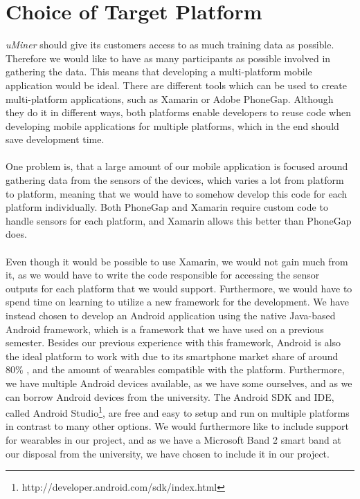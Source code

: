 
\section{Choice of Target Platform}
\label{sec:choice_of_platform}

\emph{uMiner} should give its customers access to as much training data as possible. Therefore we would like to have as many participants as possible involved in gathering the data. This means that developing a multi-platform mobile application would be ideal. There are different tools which can be used to create multi-platform applications, such as Xamarin or Adobe PhoneGap. Although they do it in different ways, both platforms enable developers to reuse code when developing mobile applications for multiple platforms, which in the end should save development time. 
\\\\
One problem is, that a large amount of our mobile application is focused around gathering data from the sensors of the devices, which varies a lot from platform to platform, meaning that we would have to somehow develop this code for each platform individually. Both PhoneGap and Xamarin require custom code to handle sensors for each platform, and Xamarin allows this better than PhoneGap does. 
\\\\
Even though it would be possible to use Xamarin, we would not gain much from it, as we would have to write the code responsible for accessing the sensor outputs for each platform that we would support. Furthermore, we would have to spend time on learning to utilize a new framework for the development. We have instead chosen to develop an Android application using the native Java-based Android framework, which is a framework that we have used on a previous semester. Besides our previous experience with this framework, Android is also the ideal platform to work with due to its smartphone market share of around 80\% \parencite{android_os_market_share}, and the amount of wearables compatible with the platform. Furthermore, we have multiple Android devices available, as we have some ourselves, and as we can borrow Android devices from the university. The Android SDK and IDE, called Android Studio\footnote{http://developer.android.com/sdk/index.html}, are free and easy to setup and run on multiple platforms in contrast to many other options. We would furthermore like to include support for wearables in our project, and as we have a Microsoft Band 2 smart band at our disposal from the university, we have chosen to include it in our project.
